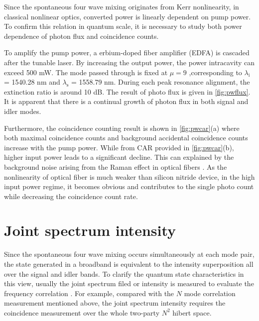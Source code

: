 Since the spontaneous four wave mixing originates from Kerr nonlinearity, in classical nonlinear optics, converted power is linearly dependent on pump power. To confirm this relation in quantum scale, it is necessary to study both power dependence of photon flux and coincidence counts.

To amplify the pump power, a erbium-doped fiber amplifier (EDFA) is cascaded after the tunable laser. By increasing the output power, the power intracavity can exceed 500 mW. 
The mode passed through is fixed at $ \mu=9 $ ,corresponding to $\lambda_\mathrm{i}$ = 1540.28 nm and $\lambda_\mathrm{s}$ = 1558.79 nm. During each peak resonance alignment, the extinction ratio is around 10 dB. 
The result of photo flux is given in \autoref{fig:pwflux}. It is apparent that there is a continual growth of photon flux in both signal and idler modes. 

\begin{figure}
	\centering
	
	\mycaption{}{}
	\label{fig:pwflux}
\end{figure}

\begin{figure}
	\centering
	
	\mycaption{}{}
	\label{fig:pwcar}
\end{figure}

Furthermore, the coincidence counting result is shown in \autoref{fig:pwcar}(a) where both maximal coincidence counts and background accidental coincidence counts increase with the pump power. While from CAR provided in \autoref{fig:pwcar}(b), higher input power leads to a significant decline. This can explained by the background noise arising from the Raman effect in optical fibers \cite{Engin2012}
. As the nonlinearity of optical fiber is much weaker than silicon nitride device, in the high input power regime, it becomes obvious and contributes to the single photo count while decreasing the coincidence count rate.

\section{Joint spectrum intensity}

Since the spontaneous four wave mixing occurs simultaneously at each mode pair, the state generated in a broadband is equivalent to the intensity superposition all over the signal and idler bands. To clarify the quantum state characteristics in this view, usually the joint spectrum filed or intensity is measured to evaluate the frequency correlation \cites{Helt2010,Vernon2015b}. For example, compared with the $ N $ mode correlation measurement mentioned above, the joint spectrum intensity requires the coincidence measurement over the whole two-party $ N^2 $ hibert space.

